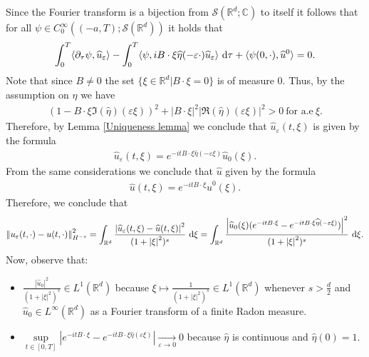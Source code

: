 \documentclass[11pt,reqno]{amsart}
\numberwithin{equation}{section}
\def\dd{{\rm d}}
\begin{document}
Since the Fourier transform is a bijection from $\mathcal{S}(\mathbb{R}^{d};\mathbb{C})$ to itself it follows that for all $\psi\in C^{\infty}_{0}((-a,T);\mathcal{S}( \mathbb{R}^{d}))$ it holds that 
\begin{align*}
\int_{0}^{T}\langle \partial_{\tau}\psi,\widehat{u}_{\varepsilon}\rangle-\int_{0}^{T}\langle \psi, iB\cdot \xi\widehat{\eta}(-\varepsilon \cdot)\widehat{u}_{\varepsilon}\rangle\ \dd \tau+\langle \psi(0,\cdot), \widehat{u}^{0}\rangle=0.        
\end{align*}
Note that since $B\neq 0$ the set $\{\xi\in \mathbb{R}^{d}\vert B\cdot \xi =0\}$ is of measure $0$. Thus, by the assumption on $\eta$ we have   
\begin{align*}
(1-B\cdot \xi\Im(\widehat{\eta})(\varepsilon\xi))^{2}+\left\vert B\cdot \xi\right\vert^{2}\left\vert \Re(\widehat{\eta})(\varepsilon\xi)\right\vert^{2}> 0 \ \mbox{for a.e}\ \xi.       
\end{align*}
Therefore, by Lemma \ref{Uniqueness lemma} we conclude that $\widehat{u}_{\varepsilon}(t,\xi)$ is given by the formula     
\begin{align*}
\widehat{u}_{\varepsilon}(t,\xi)=e^{-itB\cdot \xi \widehat{\eta}(-\varepsilon \xi)}\widehat{u}_{0}(\xi).     
\end{align*}
From the same considerations we conclude that  $\widehat{u}$ given by the formula   \begin{align}
\widehat{u}(t,\xi)=e^{-itB\cdot \xi}\widehat{u}^{0}(\xi). \label{Fourier of u formula}    
\end{align}
Therefore, we conclude that 
\begin{align*}
\left\Vert u_{\varepsilon}(t,\cdot)-u(t,\cdot)\right\Vert_{H^{-s}}^{2}=\int_{\mathbb{R}^{d}}\frac{\left\vert \widehat{u}_{\varepsilon}(t,\xi)-\widehat{u}(t,\xi)\right\vert^{2}}{(1+\left\vert \xi\right\vert^{2})^{s}}\ \dd \xi=\int_{\mathbb{R}^{d}}\frac{\left\vert \widehat{u}_{0}(\xi)(e^{-itB\cdot \xi}-e^{-itB\cdot \xi \widehat{\eta}(-\varepsilon \xi)})\right\vert^{2} }{(1+\left\vert \xi\right\vert^{2})^{s}}\ \dd \xi.    
\end{align*}
Now, observe that: 
\begin{itemize}
    \item $\frac{\left\vert \widehat{u}_{0}\right\vert^{2} }{(1+\left\vert \xi\right\vert^{2})^{s}}\in L^{1}(\mathbb{R}^{d})$ because  $\xi\mapsto \frac{1}{(1+\left\vert \xi\right\vert^{2})^{s}}\in L^{1}(\mathbb{R}^{d})$ whenever $s>\frac{d}{2}$ and  $\widehat{u}_{0}\in L^{\infty}(\mathbb{R}^{d})$ as a Fourier transform of a finite Radon measure. 
    \item $\underset{t\in [0,T]}{\sup}\left\vert e^{-itB\cdot \xi}-e^{-itB\cdot \xi \widehat{\eta}(\varepsilon\xi)}\right\vert \underset{\varepsilon \rightarrow 0}{\rightarrow} 0$ because $\widehat{\eta}$ is continuous and $\widehat{\eta}(0)=1$. 
\end{itemize}
\end{document}
